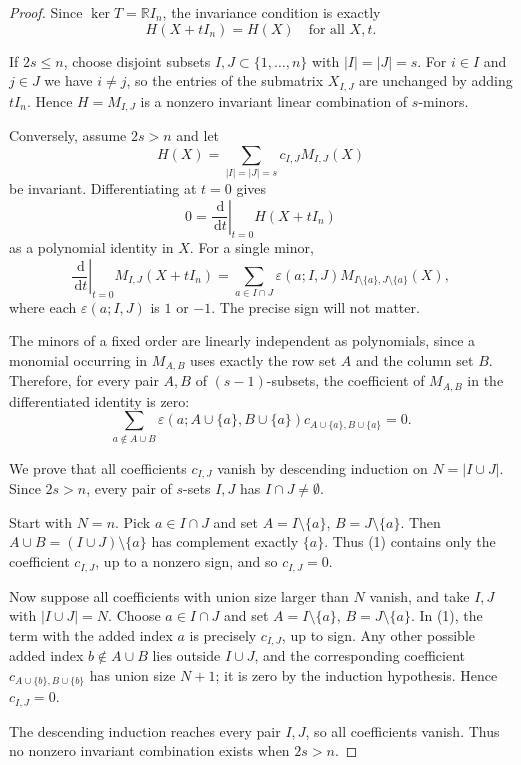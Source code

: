 \documentclass[11pt]{article}
\newcommand{\R}{\mathbb R}
\newcommand{\dd}{\,\mathrm d}
\begin{document}
\begin{proof}
Since $\ker T=\R I_n$, the invariance condition is exactly
\[
  H(X+tI_n)=H(X)\quad\text{for all }X,t.
\]

If $2s\le n$, choose disjoint subsets $I,J\subset\{1,\dots,n\}$ with
$|I|=|J|=s$. For $i\in I$ and $j\in J$ we have $i\ne j$, so the entries of the
submatrix $X_{I,J}$ are unchanged by adding $tI_n$. Hence
$H=M_{I,J}$ is a nonzero invariant linear combination of $s$-minors.

Conversely, assume $2s>n$ and let
\[
  H(X)=\sum_{|I|=|J|=s}c_{I,J}M_{I,J}(X)
\]
be invariant. Differentiating at $t=0$ gives
\[
  0=\left.\frac{\dd}{\dd t}\right|_{t=0}H(X+tI_n)
\]
as a polynomial identity in $X$. For a single minor,
\[
  \left.\frac{\dd}{\dd t}\right|_{t=0}M_{I,J}(X+tI_n)
  =
  \sum_{a\in I\cap J}\varepsilon(a;I,J)M_{I\setminus\{a\},J\setminus\{a\}}(X),
\]
where each $\varepsilon(a;I,J)$ is $1$ or $-1$. The precise sign will not
matter.

The minors of a fixed order are linearly independent as polynomials, since a
monomial occurring in $M_{A,B}$ uses exactly the row set $A$ and the column set
$B$. Therefore, for every pair $A,B$ of $(s-1)$-subsets, the coefficient of
$M_{A,B}$ in the differentiated identity is zero:
\[
  \sum_{a\notin A\cup B}
  \varepsilon(a;A\cup\{a\},B\cup\{a\})
  c_{A\cup\{a\},B\cup\{a\}}=0.
  \tag{1}
\]

We prove that all coefficients $c_{I,J}$ vanish by descending induction on
$N=|I\cup J|$. Since $2s>n$, every pair of $s$-sets $I,J$ has
$I\cap J\ne\emptyset$.

Start with $N=n$. Pick $a\in I\cap J$ and set
$A=I\setminus\{a\}$, $B=J\setminus\{a\}$. Then
$A\cup B=(I\cup J)\setminus\{a\}$ has complement exactly $\{a\}$. Thus (1)
contains only the coefficient $c_{I,J}$, up to a nonzero sign, and so
$c_{I,J}=0$.

Now suppose all coefficients with union size larger than $N$ vanish, and take
$I,J$ with $|I\cup J|=N$. Choose $a\in I\cap J$ and set
$A=I\setminus\{a\}$, $B=J\setminus\{a\}$. In (1), the term with the added index
$a$ is precisely $c_{I,J}$, up to sign. Any other possible added index
$b\notin A\cup B$ lies outside $I\cup J$, and the corresponding coefficient
$c_{A\cup\{b\},B\cup\{b\}}$ has union size $N+1$; it is zero by the induction
hypothesis. Hence $c_{I,J}=0$.

The descending induction reaches every pair $I,J$, so all coefficients vanish.
Thus no nonzero invariant combination exists when $2s>n$.
\end{proof}
\end{document}
